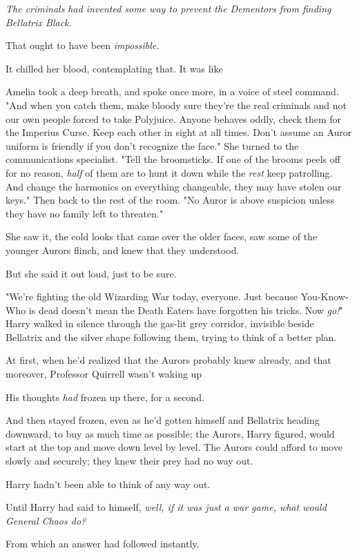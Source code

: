 \emph{The criminals had invented some way to prevent the Dementors from finding
Bellatrix Black.}

That ought to have been \emph{impossible.}

It chilled her blood, contemplating that. It was like{\el}

Amelia took a deep breath, and spoke once more, in a voice of steel command.
"And when you catch them, make bloody sure they're the real criminals and not
our own people forced to take Polyjuice. Anyone behaves oddly, check them for
the Imperius Curse. Keep each other in sight at all times. Don't assume an
Auror uniform is friendly if you don't recognize the face." She turned to the
communications specialist. "Tell the broomsticks. If one of the brooms peels
off for no reason, \emph{half} of them are to hunt it down while the
\emph{rest} keep patrolling. And change the harmonics on everything changeable,
they may have stolen our keys." Then back to the rest of the room. "No Auror is
above suspicion unless they have no family left to threaten."

She saw it, the cold looks that came over the older faces, saw some of the
younger Aurors flinch, and knew that they understood.

But she said it out loud, just to be sure.

"We're fighting the old Wizarding War today, everyone. Just because
You-Know-Who is dead doesn't mean the Death Eaters have forgotten his tricks.
Now \emph{go!}"
\sbreak
Harry walked in silence through the gas-lit grey corridor, invisible beside
Bellatrix and the silver shape following them, trying to think of a better plan.

At first, when he'd realized that the Aurors probably knew already, and that
moreover, Professor Quirrell wasn't waking up{\el}

His thoughts \emph{had} frozen up there, for a second.

And then stayed frozen, even as he'd gotten himself and Bellatrix heading
downward, to buy as much time as possible; the Aurors, Harry figured, would
start at the top and move down level by level. The Aurors could afford to move
slowly and securely; they knew their prey had no way out.

Harry hadn't been able to think of any way out.

Until Harry had said to himself, \emph{well, if it was just a war game, what
would General Chaos do?}

From which an answer had followed instantly.

